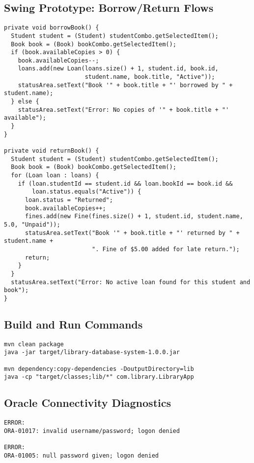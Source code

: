 \documentclass[12pt,a4paper]{article}
\begin{document}
\subsection{Swing Prototype: Borrow/Return Flows}
\begin{lstlisting}[style=java, caption=Borrow and return in Swing prototype]
private void borrowBook() {
  Student student = (Student) studentCombo.getSelectedItem();
  Book book = (Book) bookCombo.getSelectedItem();
  if (book.availableCopies > 0) {
    book.availableCopies--;
    loans.add(new Loan(loans.size() + 1, student.id, book.id,
                       student.name, book.title, "Active"));
    statusArea.setText("Book '" + book.title + "' borrowed by " + student.name);
  } else {
    statusArea.setText("Error: No copies of '" + book.title + "' available");
  }
}

private void returnBook() {
  Student student = (Student) studentCombo.getSelectedItem();
  Book book = (Book) bookCombo.getSelectedItem();
  for (Loan loan : loans) {
    if (loan.studentId == student.id && loan.bookId == book.id &&
        loan.status.equals("Active")) {
      loan.status = "Returned";
      book.availableCopies++;
      fines.add(new Fine(fines.size() + 1, student.id, student.name, 5.0, "Unpaid"));
      statusArea.setText("Book '" + book.title + "' returned by " + student.name +
                         ". Fine of $5.00 added for late return.");
      return;
    }
  }
  statusArea.setText("Error: No active loan found for this student and book");
}
\end{lstlisting}

\subsection{Build and Run Commands}
\begin{lstlisting}[style=java, caption=Build and run commands]
mvn clean package
java -jar target/library-database-system-1.0.0.jar

mvn dependency:copy-dependencies -DoutputDirectory=lib
java -cp "target/classes;lib/*" com.library.LibraryApp
\end{lstlisting}

\subsection{Oracle Connectivity Diagnostics}
\begin{lstlisting}[style=java, caption=Connectivity log excerpt]
ERROR:
ORA-01017: invalid username/password; logon denied

ERROR:
ORA-01005: null password given; logon denied
\end{lstlisting}
\end{document}
